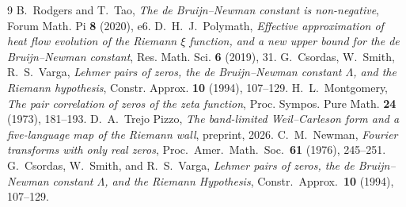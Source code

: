 \documentclass[11pt]{amsart}
\theoremstyle{definition}
\theoremstyle{remark}
\begin{document}
\begin{thebibliography}{9}
 B.~Rodgers and T.~Tao, \emph{The de Bruijn--Newman constant is non-negative}, Forum Math. Pi \textbf{8} (2020), e6.
 D.~H.~J.~Polymath, \emph{Effective approximation of heat flow evolution of the Riemann $\xi$ function, and a new upper bound for the de Bruijn--Newman constant}, Res. Math. Sci. \textbf{6} (2019), 31.
 G.~Csordas, W.~Smith, R.~S.~Varga, \emph{Lehmer pairs of zeros, the de Bruijn--Newman constant $\Lambda$, and the Riemann hypothesis}, Constr. Approx. \textbf{10} (1994), 107--129.
 H.~L.~Montgomery, \emph{The pair correlation of zeros of the zeta function}, Proc. Sympos. Pure Math. \textbf{24} (1973), 181--193.
 D.~A.~Trejo Pizzo, \emph{The band-limited Weil--Carleson form and a five-language map of the Riemann wall}, preprint, 2026.
 C.~M.~Newman, \emph{Fourier transforms with only real zeros}, Proc.\ Amer.\ Math.\ Soc.\ \textbf{61} (1976), 245--251.
 G.~Csordas, W.~Smith, and R.~S.~Varga, \emph{Lehmer pairs of zeros, the de Bruijn--Newman constant $\Lambda$, and the Riemann Hypothesis}, Constr.\ Approx.\ \textbf{10} (1994), 107--129.
\end{thebibliography}
\end{document}
